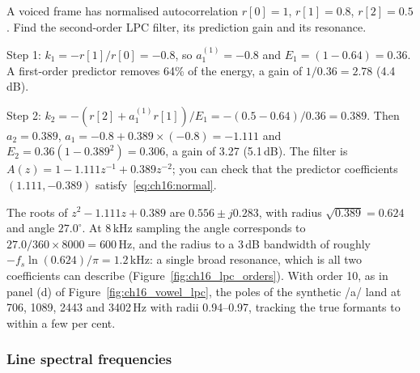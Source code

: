 
\begin{worked}
A voiced frame has normalised autocorrelation $r[0]=1$, $r[1]=0.8$, $r[2]=0.5$. Find the
second-order LPC filter, its prediction gain and its resonance.

Step 1: $k_1=-r[1]/r[0]=-0.8$, so $a_1^{(1)}=-0.8$ and $E_1=(1-0.64)=0.36$. A first-order predictor
removes 64\% of the energy, a gain of $1/0.36=2.78$ (4.4\,dB).

Step 2: $k_2=-(r[2]+a_1^{(1)}r[1])/E_1=-(0.5-0.64)/0.36=0.389$. Then $a_2=0.389$,
$a_1=-0.8+0.389\times(-0.8)=-1.111$ and $E_2=0.36(1-0.389^2)=0.306$, a gain of 3.27 (5.1\,dB). The
filter is $A(z)=1-1.111z^{-1}+0.389z^{-2}$; you can check that the predictor coefficients
$(1.111,-0.389)$ satisfy~\eqref{eq:ch16:normal}.

The roots of $z^2-1.111z+0.389$ are $0.556\pm j0.283$, with radius $\sqrt{0.389}=0.624$ and angle
$27.0^\circ$. At 8\,kHz sampling the angle corresponds to $27.0/360\times8000=600$\,Hz, and the radius
to a 3\,dB bandwidth of roughly $-f_s\ln(0.624)/\pi=1.2$\,kHz: a single broad resonance, which is all
two coefficients can describe (Figure~\ref{fig:ch16_lpc_orders}). With order 10, as in panel (d) of Figure~\ref{fig:ch16_vowel_lpc},
the poles of the synthetic /a/ land at 706, 1089, 2443 and 3402\,Hz with radii 0.94--0.97, tracking the
true formants to within a few per cent.
\end{worked}

\subsubsection{Line spectral frequencies}

